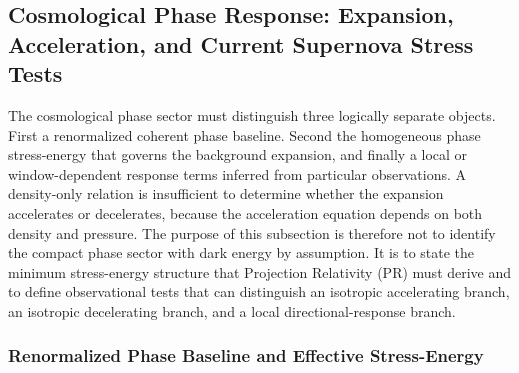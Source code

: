 \documentclass[11pt]{article}
\begin{document}
\subsection{Cosmological Phase Response: Expansion, Acceleration, and Current Supernova Stress Tests}
\label{sec:cosmological_phase_response}

The cosmological phase sector must distinguish three logically separate objects. First a renormalized coherent phase baseline. Second the homogeneous phase stress-energy that governs the background expansion, and finally a local or window-dependent response terms inferred from particular observations. A density-only relation is insufficient to determine whether the expansion accelerates or decelerates, because the acceleration equation depends on both density and pressure. The purpose of this subsection is therefore not to identify the compact phase sector with dark energy by assumption. It is to state the minimum stress-energy structure that Projection Relativity (PR) must derive and to define observational tests that can distinguish an isotropic accelerating branch, an isotropic decelerating branch, and a local directional-response branch.

\subsubsection{Renormalized Phase Baseline and Effective Stress-Energy}
\label{sec:phase_stress_energy}
\end{document}
